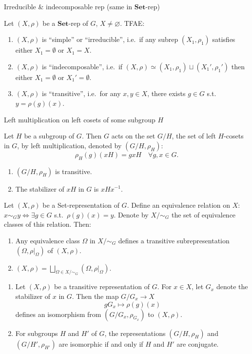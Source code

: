 \documentclass[11pt, a4paper]{report}
\begin{document}
\begin{definition}
Irreducible \& indecomposable rep (same in $\mathbf{Set}$-rep)

Let $(X, \rho)$ be a $\mathbf{Set}$-rep of $G$, $X \neq \varnothing$. TFAE:
\begin{enumerate}
\item $(X, \rho)$ is ``simple'' or ``irreducible'', i.e.\ if any subrep $(X_{1}, \rho_{1})$ satisfies either $X_{1} = \emptyset$ or $X_{1} = X$.
\item $(X, \rho)$ is ``indecomposable'', i.e.\ if $(X, \rho) \simeq (X_{1}, \rho_{1}) \sqcup (X_{1}', \rho_{1}')$ then either $X_{1} = \emptyset$ or $X_{1}' = \emptyset$.
\item $(X, \rho)$ is ``transitive'', i.e.\ for any $x, y \in X$, there exists $g \in G$ s.t.\ $y = \rho(g)(x)$.
\end{enumerate}
\end{definition}

\begin{example}
Left multiplication on left cosets of some subgroup $H$

Let $H$ be a subgroup of $G$. Then $G$ acts on the set $G/H$, the set of left $H$-cosets in $G$, by left multiplication, denoted by $(G/H, \rho_{H})$:
\[
\rho_{H}(g)(xH) = gxH \quad \forall g, x \in G.
\]
\begin{enumerate}
\item $(G/H, \rho_{H})$ is transitive.
\item The stabilizer of $xH$ in $G$ is $xHx^{-1}$.
\end{enumerate}
\end{example}
\begin{definition}
Let $(X, \rho)$ be a Set-representation of $G$. Define an equivalence relation on $X$: $x \sim_{G} y \Leftrightarrow \exists g \in G$ s.t.\ $\rho(g)(x)=y$. Denote by $X/{\sim_G}$ the set of equivalence classes of this relation. Then:
\begin{enumerate}
\item Any equivalence class $\Omega$ in $X/{\sim_G}$ defines a transitive subrepresentation $(\Omega, \rho|_{\Omega})$ of $(X, \rho)$.
\item $(X, \rho)=\bigsqcup_{\Omega \in X/{\sim_G}}\left(\Omega, \rho|_{\Omega}\right)$.
\end{enumerate}
\end{definition}

\begin{theorem}
\begin{enumerate}
\item Let $(X, \rho)$ be a transitive representation of $G$. For $x \in X$, let $G_x$ denote the stabilizer of $x$ in $G$. Then the map $G/G_x \rightarrow X$
\[
gG_x \mapsto \rho(g)(x)
\]
defines an isomorphism from $(G/G_x, \rho_{G_x})$ to $(X, \rho)$.
\item For subgroups $H$ and $H'$ of $G$, the representations $(G/H, \rho_H)$ and $(G/H', \rho_{H'})$ are isomorphic if and only if $H$ and $H'$ are conjugate.
\end{enumerate}
\end{theorem}
\end{document}
